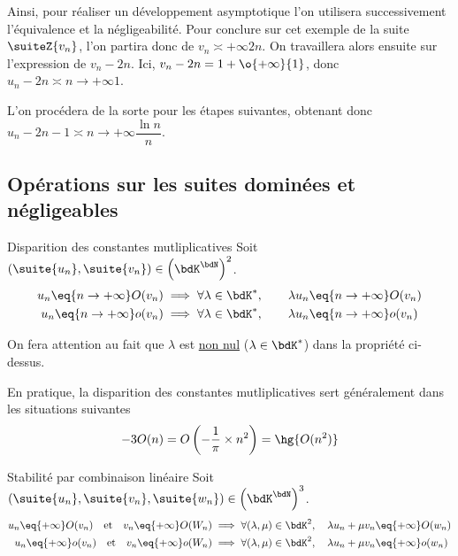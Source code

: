\documentclass[a4paper,french,bookmarks]{article}
\begin{document}
Ainsi, pour réaliser un développement asymptotique l'on utilisera successivement l'équivalence et la négligeabilité. Pour conclure sur cet exemple de la suite $\suiteZ{v_n}$, l'on partira donc de $v_n \asymp{+\infty} 2n$. On travaillera alors ensuite sur l'expression de $v_n - 2n$. Ici, $v_n - 2n = 1 + \o{+\infty}{1}$, donc $u_n - 2n \asymp{n \to +\infty} 1$. 

L'on procédera de la sorte pour les étapes suivantes, obtenant donc $u_n - 2n - 1 \asymp{n \to +\infty} \dfrac{\ln{n}}{n}$.
        
\subsection{Opérations sur les suites dominées et négligeables}

\begin{property}{Disparition des constantes mutliplicatives}{}
    Soit $\left(\suite{u_n},\suite{v_n}\right) \in \left(\bdK^\bdN\right)^2$.
    \begin{align*}
        u_n \eq{n \to +\infty} O(v_n) &\implies \forall \lambda \in \bdK^*,\qquad \lambda u_n \eq{n \to +\infty} O(v_n)\\
        u_n \eq{n \to +\infty} o(v_n) &\implies \forall \lambda \in \bdK^*,\qquad \lambda u_n \eq{n \to +\infty} o(v_n)
    \end{align*} 
\end{property}


On fera attention au fait que $\lambda$ est \underline{non nul} ($\lambda \in \bdK^*$) dans la propriété ci-dessus.

\begin{example}{}{}
    En pratique, la disparition des constantes mutliplicatives sert généralement dans les situations suivantes
    \[-3O(n) = O\left(-\dfrac{1}{\pi}\times n^2\right) = \hg{O(n^2)}\]
\end{example}

\begin{property}{Stabilité par combinaison linéaire}{}
    Soit $\left(\suite{u_n},\suite{v_n}, \suite{w_n}\right) \in \left(\bdK^\bdN\right)^3$.
    \begin{align*}
        u_n \eq{+\infty} O(v_n) \quad \text{et} \quad v_n \eq{+\infty} O(W_n) &\implies \forall (\lambda, \mu) \in \bdK^2, \quad \lambda u_n + \mu v_n \eq{+\infty} O(w_n)\\
        u_n \eq{+\infty} o(v_n) \quad \text{et} \quad v_n \eq{+\infty} o(W_n) &\implies \forall (\lambda, \mu) \in \bdK^2, \quad \lambda u_n + \mu v_n \eq{+\infty} o(w_n) 
    \end{align*} 
\end{property}
\end{document}
